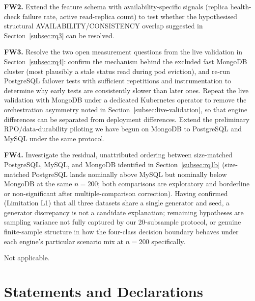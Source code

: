 \documentclass[iicol,pdflatex,sn-mathphys-num]{sn-jnl}
\theoremstyle{thmstyleone}
\theoremstyle{thmstylethree}
\begin{document}
\textbf{FW2.} Extend the feature schema with availability-specific
signals (replica health-check failure rate, active read-replica count)
to test whether the hypothesised structural AVAILABILITY/CONSISTENCY
overlap suggested in Section~\ref{subsec:rq3} can be resolved.

\textbf{FW3.} Resolve the two open measurement questions from the live
validation in Section~\ref{subsec:rq4}: confirm the mechanism behind
the excluded fast MongoDB cluster (most plausibly a stale status read
during pod eviction), and re-run PostgreSQL failover tests with
sufficient repetitions and instrumentation to determine why early
tests are consistently slower than later ones. Repeat the live
validation with MongoDB under a dedicated Kubernetes operator to
remove the orchestration asymmetry noted in
Section~\ref{subsec:live-validation}, so that engine differences can
be separated from deployment differences. Extend the preliminary
RPO/data-durability piloting we have begun on MongoDB to PostgreSQL
and MySQL under the same protocol.

\textbf{FW4.} Investigate the residual, unattributed ordering between
size-matched PostgreSQL, MySQL, and MongoDB identified in
Section~\ref{subsec:rq1b} (size-matched PostgreSQL lands nominally above
MySQL but nominally below MongoDB at the same $n=200$; both
comparisons are exploratory and borderline or non-significant after
multiple-comparison correction).
Having confirmed (Limitation L1) that all three datasets share a
single generator and seed, a generator discrepancy is not a candidate
explanation; remaining hypotheses are sampling variance not fully
captured by our 20-subsample protocol, or genuine finite-sample
structure in how the four-class decision boundary behaves under each
engine's particular scenario mix at $n=200$ specifically.

\backmatter

Not applicable.

\section*{Statements and Declarations}
\end{document}
